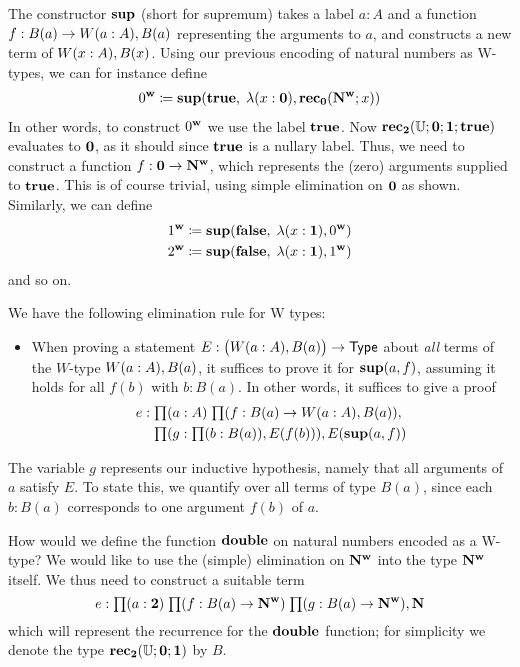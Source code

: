 The constructor $\mathbf{sup}$ (short for supremum) takes a label $a : A$ and a function $f : B(a) \to W(a:A), B(a)$ representing the arguments to $a$, and constructs a new term of $W(x:A), B(x)$. Using our previous encoding of natural numbers as W-types, we can for instance define
\begin{align*}
0^\mathbf{w} \coloneqq \mathbf{sup}(\mathbf{true}, \; \lambda(x : \mathbf{0}), \mathbf{rec}_\mathbf{0}(\mathbf{N^w};x))
\end{align*}
In other words, to construct $0^\mathbf{w}$ we use the label $\mathbf{true}$. Now $\mathbf{rec}_\mathbf{2}(\mathbb{U};\mathbf{0};\mathbf{1}; \mathbf{true})$ evaluates to $\mathbf{0}$, as it should since $\mathbf{true}$ is a nullary label. Thus, we need to construct a function $f : \mathbf{0} \to \mathbf{N^w}$, which represents the (zero) arguments supplied to $\mathbf{true}$. This is of course trivial, using simple elimination on $\mathbf{0}$ as shown. Similarly, we can define
\begin{align*}
1^\mathbf{w} \coloneqq \mathbf{sup}(\mathbf{false}, \; \lambda(x : \mathbf{1}), 0^\mathbf{w}) \\
2^\mathbf{w} \coloneqq \mathbf{sup}(\mathbf{false}, \; \lambda(x : \mathbf{1}), 1^\mathbf{w})
\end{align*}
and so on.

We have the following elimination rule for W types:
\begin{itemize}
\item When proving a statement $E : \big(W(a:A), B(a)\big) \to \mathsf{Type}$ about \emph{all} terms of the $W$-type $W(a:A), B(a)$, it suffices to prove it for $\mathbf{sup}(a,f)$, assuming it holds for all $f(b)$ with $b : B(a)$. 
In other words, it suffices to give a proof 
\begin{align*}
e : & \; \prd{a:A}{f : B(a) \to \wtype{a:A} B(a)}\\ & \; \prd{g : \prd{b : B(a)} E(f(b))} E(\supp(a,f))
\end{align*}
\end{itemize}

The variable $g$ represents our inductive hypothesis, namely that all arguments of $a$ satisfy $E$. To state this, we quantify over all terms of type $B(a)$, since each $b : B(a)$ corresponds to one argument $f(b)$ of $a$.

How would we define the function $\mathbf{double}$ on natural numbers encoded as a W-type? We would like to use the (simple) elimination on $\mathbf{N^w}$ into the type $\mathbf{N^w}$ itself. We thus need to construct a suitable term 
\[e : \prd{a : \two}{f : B(a) \to \natw}{g : B(a) \to \natw} \nat\]
which will represent the recurrence for the $\mathbf{double}$ function; for simplicity we denote the type $\mathbf{rec}_\mathbf{2}(\mathbb{U};\mathbf{0};\mathbf{1})$ by $B$.


